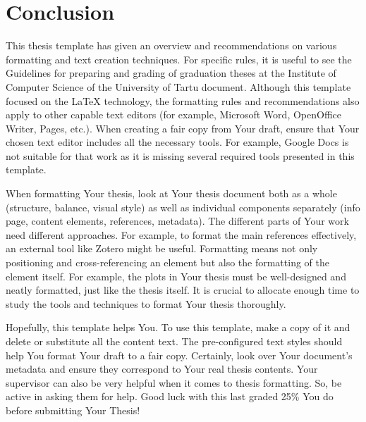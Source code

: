 \section{Conclusion} \label{Conclusion}
This thesis template has given an overview and recommendations on various formatting and text creation techniques. For specific rules, it is useful to see the Guidelines for preparing and grading of graduation theses at the Institute of Computer Science of the University of Tartu document. Although this template focused on the LaTeX technology, the formatting rules and recommendations also apply to other capable text editors (for example, Microsoft Word, OpenOffice Writer, Pages, etc.). When creating a fair copy from Your draft, ensure that Your chosen text editor includes all the necessary tools. For example, Google Docs is not suitable for that work as it is missing several required tools presented in this template.

When formatting Your thesis, look at Your thesis document both as a whole (structure, balance, visual style) as well as individual components separately (info page, content elements, references, metadata). The different parts of Your work need different approaches. For example, to format the main references effectively, an external tool like Zotero might be useful. Formatting means not only positioning and cross-referencing an element but also the formatting of the element itself. For example, the plots in Your thesis must be well-designed and neatly formatted, just like the thesis itself. It is crucial to allocate enough time to study the tools and techniques to format Your thesis thoroughly.

Hopefully, this template helps You. To use this template, make a copy of it and delete or substitute all the content text. The pre-configured text styles should help You format Your draft to a fair copy. Certainly, look over Your document’s metadata and ensure they correspond to Your real thesis contents. Your supervisor can also be very helpful when it comes to thesis formatting. So, be active in asking them for help. Good luck with this last graded 25\% You do before submitting Your Thesis!
